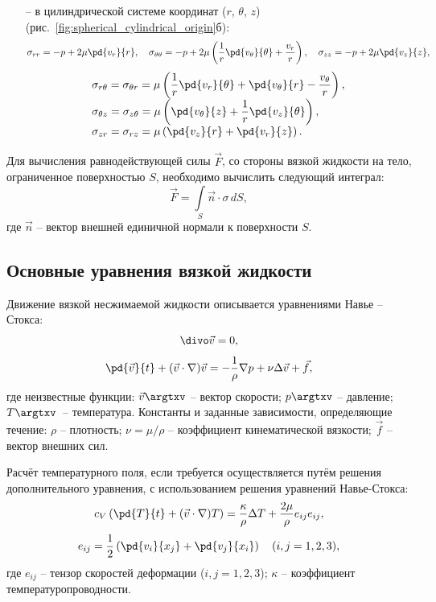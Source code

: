 \documentclass[a4paper, 14pt]{extarticle}
\begin{document}
\begin{itemize}
	\item[--] в цилиндрической системе координат ($r$, $\theta$, $z$) (рис.~\ref{fig:spherical_cylindrical_origin}б):
	\[
	\sigma_{rr} = -p + 2 \mu \pd{v_r}{r},\quad
	\sigma_{\theta\theta} = -p + 2\mu \left( \frac{1}{r} \pd{v_\theta}{\theta} +\frac{v_r}{r} \right),\quad
	\sigma_{zz} = -p + 2\mu \pd{v_z}{z},
	\]
	\[
	\begin{array}{l}
		\sigma_{r\theta} = \sigma_{\theta r} = \displaystyle \mu\left(
		\frac{1}{r} \pd{v_r}{\theta} + \pd{v_\theta}{r} - \frac{v_\theta}{r}
		\right), \\
		\sigma_{\theta z} =  \sigma_{z\theta}= \displaystyle \mu \left(
		 \pd{v_\theta}{z} + \frac{1}{r}\pd{v_z}{\theta} 
		\right),\\
		\sigma_{zr} =  \sigma_{rz}= \displaystyle \mu \left(
		\pd{v_z}{r} + \pd{v_r}{z}
		\right).
	\end{array}
	\]
\end{itemize}

Для вычисления равнодействующей силы $\vec{F}$, со стороны вязкой жидкости на тело, ограниченное поверхностью $S$, необходимо вычислить следующий интеграл:
\[
\vec{F} = \int\limits_S \vec{n} \cdot \sigma \, dS,
\]
где $\vec{n}$ -- вектор внешней единичной нормали к поверхности $S$.


\subsection{Основные уравнения вязкой жидкости}

Движение вязкой несжимаемой жидкости описывается \alert{уравнениями Навье -- Стокса}:
\[
	\divo \vec{v} = 0,
\]
\[
	\pd{\vec{v}}{t} + (\vec{v}\cdot\nabla)\vec{v} = -\frac{1}{\rho}\nabla p + \nu \Delta \vec{v} + \vec{f},
\]
где \alert{неизвестные функции}: $\vec{v}\argtxv$ -- вектор скорости; $p\argtxv$ -- давление; $T\argtxv$~-- температура. \alert{Константы и заданные зависимости}, определяющие течение: $\rho$ -- плотность; $\nu=\mu/\rho$ -- коэффициент кинематической вязкости; $\vec{f}$ -- вектор внешних сил. 
		
Расчёт температурного поля, если требуется осуществляется путём решения дополнительного уравнения, с использованием решения уравнений Навье-Стокса:
\[
c_V\left(\pd{T}{t} + (\vec{v}\cdot\nabla)T \right) = \frac{\kappa}{\rho} \Delta T + \frac{2\mu}{\rho} e_{ij}e_{ij},
\]
\[
e_{ij} = \frac{1}{2}\left(
\pd{v_i}{x_j}+\pd{v_j}{x_i}
\right)\quad
(i,j = 1,2,3),
\]
где $e_{ij}$ -- тензор скоростей деформации ($i,j = 1,2,3$); $\kappa$ -- коэффициент температуропроводности.
\end{document}

